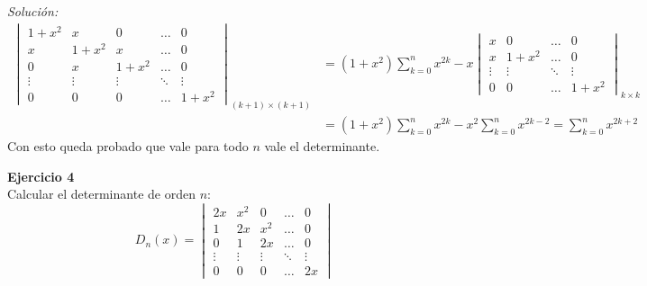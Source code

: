 \documentclass{article}
\newenvironment{problem}[2][Ejercicio]
    { \begin{mdframed}[backgroundcolor=gray!20] \textbf{#1 #2} \\}
    {  \end{mdframed}}
\newenvironment{solution}
    {\textit{Solución:}}
    {}
\begin{document}
\begin{solution}
\[\begin{aligned}
\begin{vmatrix}
1 + x^2 & x & 0 & \dots & 0 \\
x & 1 + x^2 & x & \dots & 0 \\
0 & x & 1 + x^2 & \dots & 0 \\
\vdots & \vdots & \vdots & \ddots & \vdots \\
0 & 0 & 0 & \dots & 1+x^2
\end{vmatrix}_{(k+ 1)\times (k+1)} &= (1+x^2)\sum_{k=0}^{n} x^{2k} - x
\begin{vmatrix}
x & 0 & \dots & 0 \\
x & 1 + x^2 & \dots & 0 \\
\vdots & \vdots & \ddots & \vdots \\
0 & 0 & \dots & 1+x^2
\end{vmatrix}_{k\times k} \\
&= (1+x^2)\sum_{k=0}^{n} x^{2k} - x^2\sum_{k=0}^{n} x^{2k-2} = \sum_{k=0}^{n} x^{2k+2}
\end{aligned}
\]
Con esto queda probado que vale para todo $n$ vale el determinante.
\end{solution}
\newpage
\begin{problem}{4}
    Calcular el determinante de orden $n$:
\[
D_n(x) = 
\begin{vmatrix}
2x & x^2 & 0 & \dots & 0 \\
1 & 2x & x^2 & \dots & 0 \\
0 & 1 & 2x & \dots & 0 \\
\vdots & \vdots & \vdots & \ddots & \vdots \\
0 & 0 & 0 & \dots & 2x
\end{vmatrix}
\]
\end{problem}
\end{document}
